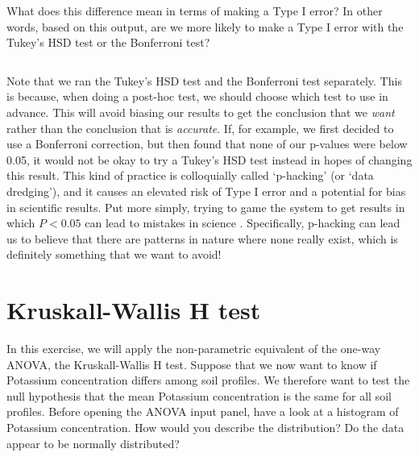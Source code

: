 \documentclass[
  openany]{scrbook}
\begin{document}
\begin{verbatim}
\end{verbatim}

What does this difference mean in terms of making a Type I error?
In other words, based on this output, are we more likely to make a Type I error with the Tukey's HSD test or the Bonferroni test?

\begin{verbatim}

\end{verbatim}

Note that we ran the Tukey's HSD test and the Bonferroni test separately.
This is because, when doing a post-hoc test, we should choose which test to use in advance.
This will avoid biasing our results to get the conclusion that we \emph{want} rather than the conclusion that is \emph{accurate}.
If, for example, we first decided to use a Bonferroni correction, but then found that none of our p-values were below 0.05, it would not be okay to try a Tukey's HSD test instead in hopes of changing this result.
This kind of practice is colloquially called `p-hacking' (or `data dredging'), and it causes an elevated risk of Type I error and a potential for bias in scientific results.
Put more simply, trying to game the system to get results in which \(P < 0.05\) can lead to mistakes in science \citep{Head2015}.
Specifically, p-hacking can lead us to believe that there are patterns in nature where none really exist, which is definitely something that we want to avoid!

\hypertarget{kruskall-wallis-h-test}{%
\section{Kruskall-Wallis H test}\label{kruskall-wallis-h-test}}

In this exercise, we will apply the non-parametric equivalent of the one-way ANOVA, the Kruskall-Wallis H test.
Suppose that we now want to know if Potassium concentration differs among soil profiles.
We therefore want to test the null hypothesis that the mean Potassium concentration is the same for all soil profiles.
Before opening the ANOVA input panel, have a look at a histogram of Potassium concentration.
How would you describe the distribution?
Do the data appear to be normally distributed?

\begin{verbatim}

\end{verbatim}
\end{document}
